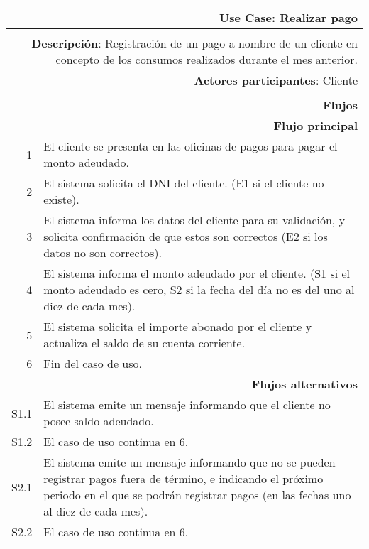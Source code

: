 \begin{tabularx}{\textwidth}{| r | X |}
\hline
\multicolumn{2}{|X|}{
\textbf{Use Case}: Realizar pago} \\

\hline
\multicolumn{2}{|c|}{\cellcolor[gray]{0.6}} \\

\hline
\multicolumn{2}{|X|}{
\textbf{Descripción}: Registración de un pago a nombre de un cliente en
concepto de los consumos realizados durante el mes anterior.} \\

\hline
\multicolumn{2}{|X|}{
\textbf{Actores participantes}: Cliente} \\

\hline
\multicolumn{2}{|c|}{\cellcolor[gray]{0.6} } \\

\hline
\multicolumn{2}{|X|}{
\textbf{Flujos}} \\

\hline
\multicolumn{2}{|X|}{
\textbf{Flujo principal}} \\

\hline
1 & El cliente se presenta en las oficinas de pagos para pagar el monto
adeudado. \\
\hline
2 & El sistema solicita el DNI del cliente. (E1 si el cliente no existe). \\
\hline
3 & El sistema informa los datos del cliente para su validación, y solicita
confirmación de que estos son correctos (E2 si los datos no son correctos). \\
\hline
4 & El sistema informa el monto adeudado por el cliente. (S1 si el monto
adeudado es cero, S2 si la fecha del día no es del uno al diez de cada mes). \\
\hline
5 & El sistema solicita el importe abonado por el cliente y actualiza el saldo
de su cuenta corriente.\\
\hline
6 & Fin del caso de uso. \\

\hline
\multicolumn{2}{|X|}{
\textbf{Flujos alternativos}} \\

\hline
S1.1 & El sistema emite un mensaje informando que el cliente no posee saldo
adeudado. \\
\hline
S1.2 & El caso de uso continua en 6. \\

\hline
S2.1 & El sistema emite un mensaje informando que no se pueden registrar pagos
fuera de término, e indicando el próximo periodo en el que se podrán registrar
pagos (en las fechas uno al diez de cada mes). \\
\hline
S2.2 & El caso de uso continua en 6. \\



\end{tabularx}
